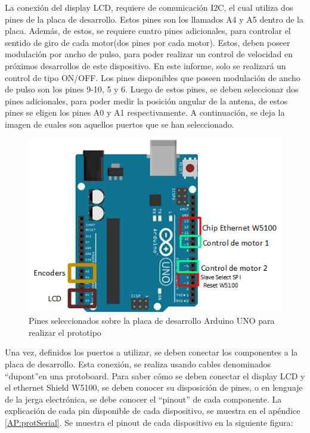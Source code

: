 La conexión del display LCD, requiere de comunicación I2C, el cual utiliza dos pines de la placa de desarrollo. Estos pines son los llamados A4 y A5 dentro de la placa. Además, de estos, se requiere cuatro pines adicionales, para controlar el sentido de giro de cada motor(dos pines por cada motor). Estos, deben poseer modulación por ancho de pulso, para poder realizar un control de velocidad en próximos desarrollos de este dispositivo. En este informe, solo se realizará un control de tipo ON/OFF. Los pines disponibles que poseen modulación de ancho de pulso son los pines 9-10, 5 y 6. Luego de estos pines, se deben seleccionar dos pines adicionales, para poder medir la posición angular de la antena, de estos pines se eligen los pines A0 y A1 respectivamente. A continuación, se deja la imagen de cuales son aquellos puertos que se han seleccionado.   

\begin{figure}[H]
	\centering
	\includegraphics{pines_ard_uno}
	\caption{Pines seleccionados sobre la placa de desarrollo Arduino UNO para realizar el prototipo}
	\label{fig:pin_select_ard_uno}
\end{figure}

\vspace{-4mm}
Una vez, definidos los puertos a utilizar, se deben conectar los componentes a la placa de desarrollo. Esta conexión, se realiza usando cables denominados ``dupont''en una protoboard. 
Para saber cómo se deben conectar el display LCD y el ethernet Shield W5100, se deben conocer su disposición de pines, o en lenguaje de la jerga electrónica, se debe conocer el ``pinout'' de cada componente. La explicación de cada pin disponible de cada dispositivo, se muestra en el apéndice \ref{AP:protSerial}. Se muestra el pinout  de cada dispositivo en la siguiente figura: %

